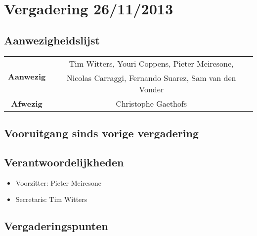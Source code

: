 \section{Vergadering 26/11/2013}
\subsection{Aanwezigheidslijst}
\begin{table}[htbp]
	\centering
	\begin{tabular}{c|c}
		\multirow{2}{*}{\textbf{Aanwezig}} & Tim Witters, Youri Coppens, Pieter Meiresone, \\
		& Nicolas Carraggi, Fernando Suarez, Sam van den Vonder \\
		\hline
		\textbf{Afwezig} & Christophe Gaethofs \\
	\end{tabular}
\end{table}

\subsection{Vooruitgang sinds vorige vergadering}


\subsection{Verantwoordelijkheden}
\begin{itemize}
	\item Voorzitter: Pieter Meiresone
	\item Secretaris: Tim Witters
\end{itemize}
\subsection{Vergaderingspunten}

